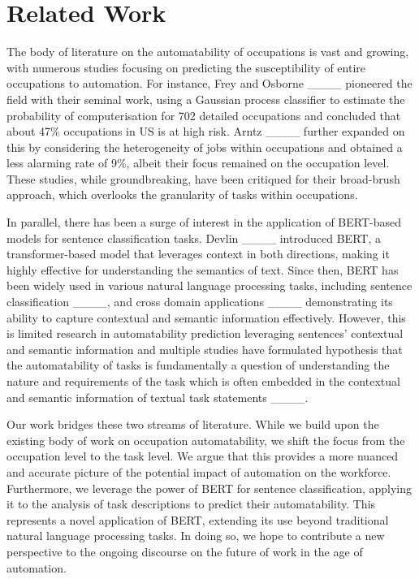 \section{Related Work}
The body of literature on the automatability of occupations is vast and growing, with numerous studies focusing on predicting the susceptibility of entire occupations to automation. For instance, Frey and Osborne ____ pioneered the field with their seminal work, using a Gaussian process classifier to estimate the probability of computerisation for 702 detailed occupations and concluded that about 47\% occupations in US is at high risk. Arntz ____ further expanded on this by considering the heterogeneity of jobs within occupations and obtained a less alarming rate of 9\%, albeit their focus remained on the occupation level. These studies, while groundbreaking, have been critiqued for their broad-brush approach, which overlooks the granularity of tasks within occupations.\par

In parallel, there has been a surge of interest in the application of BERT-based models for sentence classification tasks. Devlin ____ introduced BERT, a transformer-based model that leverages context in both directions, making it highly effective for understanding the semantics of text. Since then, BERT has been widely used in various natural language processing tasks, including sentence classification ____, and cross domain applications ____ demonstrating its ability to capture contextual and semantic information effectively. However, this is limited research in automatability prediction leveraging sentences' contextual and semantic information and multiple studies have formulated hypothesis that the automatability of tasks is fundamentally a question of understanding the nature and requirements of the task which is often embedded in the contextual and semantic information of textual task statements ____.\par

Our work bridges these two streams of literature. While we build upon the existing body of work on occupation automatability, we shift the focus from the occupation level to the task level. We argue that this provides a more nuanced and accurate picture of the potential impact of automation on the workforce. Furthermore, we leverage the power of BERT for sentence classification, applying it to the analysis of task descriptions to predict their automatability. This represents a novel application of BERT, extending its use beyond traditional natural language processing tasks. In doing so, we hope to contribute a new perspective to the ongoing discourse on the future of work in the age of automation.\par